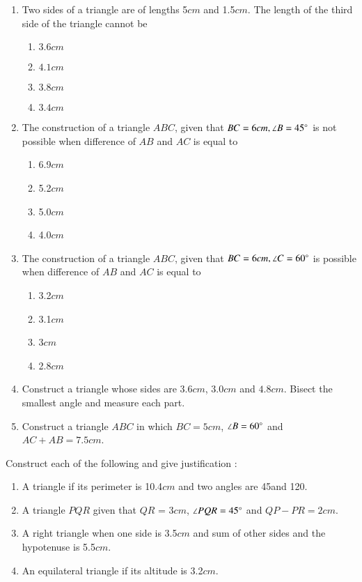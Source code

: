 \begin{enumerate}[label=\thesubsection.\arabic*,ref=\thesubsection.\theenumi]
\item Two sides of a triangle are of lengths 5$cm$ and 1.5$cm$. The length of the third side of the triangle cannot be
\begin{enumerate}
\item $3.6 cm$
\item $4.1 cm$
\item $3.8 cm$
\item $3.4 cm$
\end{enumerate}
\item The construction of a triangle $ABC$, given that $BC = 6 cm, \angle B = 45\degree$ is not possible when difference of $AB$ and $AC$ is equal to
		\begin{enumerate}
			\item 6.9$cm$
			\item 5.2$cm$
			\item 5.0$cm$
			\item 4.0$cm$
		\end{enumerate}
	\item The construction of a triangle $ABC$, given that $BC = 6 cm, \angle C = 60\degree$ is possible when difference of $AB$ and $AC$ is equal to
		\begin{enumerate}
			\item 3.2$cm$
			\item 3.1$cm$
			\item 3$cm$
			\item 2.8$cm$
		\end{enumerate}
\item Construct a triangle whose sides are $3.6 cm$, $3.0 cm$ and $4.8 cm$. Bisect the smallest angle and measure each part.
\item Construct a triangle $ABC$ in which $BC = 5 cm$, $\angle B = 60\degree$ and $AC+AB = 7.5cm$.
\end{enumerate}
Construct each of the following and give justification :
\begin{enumerate}[label=\thesection.\arabic*,ref=\thesection.\theenumi,resume*]
\item A triangle if its perimeter is 10.4$cm$ and two angles are 45\degree and 120\degree.
\item A triangle $PQR$ given that $QR$ = 3$cm$, $\angle PQR = 45\degree$ and $QP - PR = 2 cm$.
\item A right triangle when one side is 3.5$cm$ and sum of other sides and the hypotenuse
is 5.5$cm$.
\item An equilateral triangle if its altitude is 3.2$cm$.
\end{enumerate}                               
